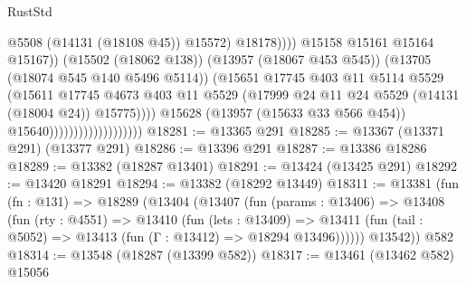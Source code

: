 \begin{lexlean}{RustStd}
\begin{coremodule}
                                                          @5508
                                                          (@14131 (@18108 @45))
                                                          @15572)
                                                        @18178))))
                                                @15158
                                                @15161
                                                @15164
                                                @15167))
                                            (@15502 (@18062 @138))
                                            (@13957 (@18067 @453 @545))
                                            (@13705 (@18074 @545 @140 @5496 @5114))
                                            (@15651
                                              @17745
                                              @403
                                              @11
                                              @5114
                                              @5529
                                              (@15611
                                                @17745
                                                @4673
                                                @403
                                                @11
                                                @5529
                                                (@17999
                                                  @24
                                                  @11
                                                  @24
                                                  @5529
                                                  (@14131 (@18004 @24))
                                                  @15775))))
                                          @15628
                                          (@13957 (@15633 @33 @566 @454))
                                          @15640)))))))))))))))))))
@18281 := @13365 @291
@18285 := @13367 (@13371 @291) (@13377 @291)
@18286 := @13396 @291
@18287 := @13386 @18286
@18289 := @13382 (@18287 @13401)
@18291 := @13424 (@13425 @291)
@18292 := @13420 @18291
@18294 := @13382 (@18292 @13449)
@18311 := @13381
    (fun (fn : @131) =>
    @18289
      (@13404
        (@13407
          (fun (params : @13406) =>
          @13408
            (fun (rty : @4551) =>
            @13410
              (fun (lets : @13409) =>
              @13411 (fun (tail : @5052) => @13413 (fun (Γ : @13412) => @18294 @13496))))))
        @13542))
    @582
@18314 := @13548 (@18287 (@13399 @582))
@18317 := @13461 (@13462 @582) @15056

\end{coremodule}
\end{lexlean}
